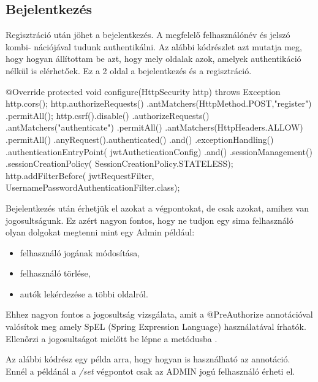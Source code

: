 \subsection{Bejelentkezés}

Regisztráció után jöhet a bejelentkezés. A megfelelő felhasználónév és jelszó kombi-
nációjával tudunk authentikálni. Az alábbi kódrészlet azt mutatja meg, hogy hogyan állítottam be azt, hogy mely oldalak azok, amelyek authentikáció nélkül is elérhetőek. Ez a 2 oldal a bejelentkezés és a regisztráció.

\begin{java}
    @Override
    protected void configure(HttpSecurity http)
     throws Exception {
        http.cors();
        http.authorizeRequests()
        .antMatchers(HttpMethod.POST,"register")
        .permitAll();
        http.csrf().disable()
          .authorizeRequests()
          .antMatchers("authenticate")
          .permitAll()
          .antMatchers(HttpHeaders.ALLOW)
          .permitAll()
          .anyRequest().authenticated()
          .and()
          .exceptionHandling()
          .authenticationEntryPoint(
           jwtAutheticationConfig)
          .and()
          .sessionManagement()
          .sessionCreationPolicy(
          SessionCreationPolicy.STATELESS);
          http.addFilterBefore(
          jwtRequestFilter,
          UsernamePasswordAuthenticationFilter.class);
}
\end{java}

Bejelentkezés után érhetjük el azokat a végpontokat, de csak azokat, amihez van jogosultságunk. Ez azért nagyon fontos, hogy ne tudjon egy sima felhasználó olyan dolgokat megtenni mint egy Admin például:

\begin{itemize}
\item felhasználó jogának módosítása,
\item felhasználó törlése,
\item autók lekérdezése a többi oldalról.
\end{itemize}

Ehhez nagyon fontos a jogosultság vizsgálata, amit a @PreAuthorize annotációval valósítok meg amely SpEL (Spring Expression Language) használatával írhatók. Ellenőrzi a jogosultságot mielőtt be lépne a metódusba \cite{SpringSecurity}.

Az alábbi kódrész egy példa arra, hogy hogyan is használható az annotáció. Ennél a példánál a \textit{/set} végpontot csak az ADMIN jogú felhasználó érheti el.

